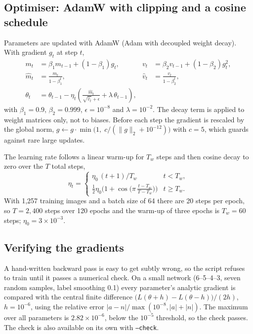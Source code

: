 \documentclass[11pt,a4paper]{article}
\newcommand{\code}[1]{\texttt{#1}}
\begin{document}
\subsection{Optimiser: AdamW with clipping and a cosine schedule}
Parameters are updated with AdamW (Adam with decoupled weight decay). With gradient $g_t$ at step $t$,
\begin{align}
  m_t&=\beta_1 m_{t-1}+(1-\beta_1)g_t, & v_t&=\beta_2 v_{t-1}+(1-\beta_2)g_t^{2},\\
  \hat m_t&=\frac{m_t}{1-\beta_1^{t}}, & \hat v_t&=\frac{v_t}{1-\beta_2^{t}},\\
  \theta_t&=\theta_{t-1}-\eta_t\!\left(\frac{\hat m_t}{\sqrt{\hat v_t}+\epsilon}+\lambda\,\theta_{t-1}\right),
\end{align}
with $\beta_1=0.9$, $\beta_2=0.999$, $\epsilon=10^{-8}$ and $\lambda=10^{-2}$. The decay term is applied to weight matrices only, not to biases. Before each step the gradient is rescaled by the global norm,
$g\leftarrow g\cdot\min\!\big(1,\;c/(\lVert g\rVert_2+10^{-12})\big)$ with $c=5$, which guards against rare large updates.

The learning rate follows a linear warm-up for $T_w$ steps and then cosine decay to zero over the $T$ total steps,
\begin{equation}
  \eta_t=
  \begin{cases}
    \eta_0\,(t+1)/T_w & t<T_w,\\[2pt]
    \tfrac{1}{2}\eta_0\big(1+\cos\!\big(\pi\,\tfrac{t-T_w}{T-T_w}\big)\big) & t\ge T_w.
  \end{cases}
\end{equation}
With 1{,}257 training images and a batch size of 64 there are 20 steps per epoch, so $T=2{,}400$ steps over 120 epochs and the warm-up of three epochs is $T_w=60$ steps; $\eta_0=3\times10^{-3}$.

\subsection{Verifying the gradients}
A hand-written backward pass is easy to get subtly wrong, so the script refuses to train until it passes a numerical check. On a small network (6--5--4--3, seven random samples, label smoothing 0.1) every parameter's analytic gradient is compared with the central finite difference
$\big(L(\theta+h)-L(\theta-h)\big)/(2h)$, $h=10^{-6}$, using the relative error $|a-n|/\max(10^{-8},|a|+|n|)$. The maximum over all parameters is $2.82\times10^{-6}$, below the $10^{-5}$ threshold, so the check passes. The check is also available on its own with \code{--check}.
\end{document}
